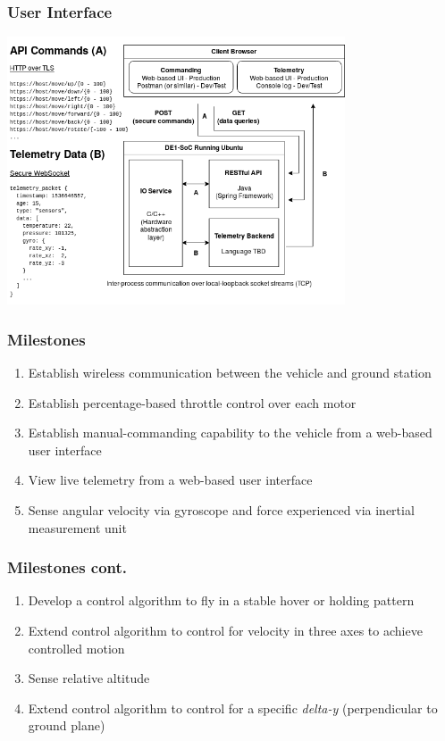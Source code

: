 \documentclass{beamer}
\begin{document}
\begin{frame}
\frametitle{User Interface}
\begin{center}
\includegraphics[height=225pt,width=\linewidth,keepaspectratio]{../src/im/display_controller}
\end{center}
\end{frame}

\begin{frame}
\frametitle{Milestones}
\begin{enumerate}[label=\arabic*),itemsep=10pt]
	\item Establish wireless communication between the vehicle and
		ground station
	\item Establish percentage-based throttle control over each motor
	\item Establish manual-commanding capability to the vehicle from a
		web-based user interface
	\item View live telemetry from a web-based user interface
	\item Sense angular velocity via gyroscope and force experienced via
		inertial measurement unit
\end{enumerate}
\end{frame}

\begin{frame}
\frametitle{Milestones cont.}
\begin{enumerate}[start=6,label=\arabic*),itemsep=10pt]
	\item Develop a control algorithm to fly in a stable hover or
		holding pattern
	\item Extend control algorithm to control for velocity in three axes
		to achieve controlled motion
	\item Sense relative altitude
	\item Extend control algorithm to control for a specific \textit{delta-y}
		(perpendicular to ground plane) 
\end{enumerate}
\end{frame}
\end{document}
